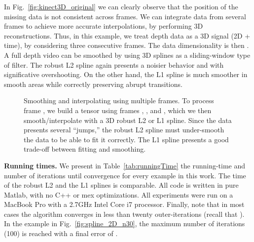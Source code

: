\documentclass[preprint]{imsart}
\begin{document}
In Fig.~\ref{fig:kinect3D_original} we can clearly observe that the position of the missing data is not consistent across frames. We can integrate data from several frames to achieve more accurate interpolations, by performing 3D reconstructions.
Thus, in this example, we treat depth data as a 3D signal (2D + time), by considering three consecutive frames. The data dimensionality is then . A full depth video can be smoothed by using 3D splines as a sliding-window type of filter. The robust L2 spline again presents a noisier behavior and with significative overshooting. On the other hand, the L1 spline is much smoother in smooth areas while correctly preserving abrupt transitions.

\begin{figure*}
    \centering
    
    \centerline{
        \hfill
        \hfill
        \hfill
    }
    

    \caption{Smoothing and interpolating using multiple frames. To process frame , we build a  tensor using frames , , and , which we then smooth/interpolate with a 3D robust L2 or L1 spline. Since the data presents several ``jumps,'' the robust L2 spline must under-smooth the data to be able to fit it correctly. The L1 spline presents a good trade-off between fitting and smoothing.}
    \label{fig:kinect3D}
\end{figure*}

\noindent\textbf{Running times.}
We present in Table~\ref{tab:runningTime} the running-time and number of iterations until convergence for every example in this work. The time of the robust L2 and the L1 splines is comparable. All code is written in pure Matlab, with no C++ or mex optimizations. All experiments were run on  a MacBook Pro with a 2.7GHz Intel Core i7 processor.
Finally, note that in most cases the algorithm converges in less than twenty outer-iterations (recall that ). In the example in Fig.~\ref{fig:spline_2D_n30}, the maximum number of iterations (100) is reached with a final error of .
\end{document}
